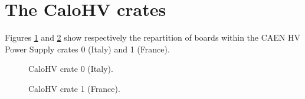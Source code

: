 
\clearpage
\section{The CaloHV crates}

Figures \ref{fig:calohv:crates:1}  and \ref{fig:calohv:crates:2}  show
respectively the repartition of boards within the CAEN HV Power Supply
crates 0 (Italy) and 1 (France).

\begin{figure}[h!]
  \begin{center}
    \scalebox{0.6}{}
  \end{center}
  \caption{CaloHV crate 0 (Italy).}
  \label{fig:calohv:crates:1}
\end{figure}

\begin{figure}[h!]
  \begin{center}
    \scalebox{0.6}{}
  \end{center}
  \caption{CaloHV crate 1 (France).}
  \label{fig:calohv:crates:2}
 
\end{figure}

\clearpage

